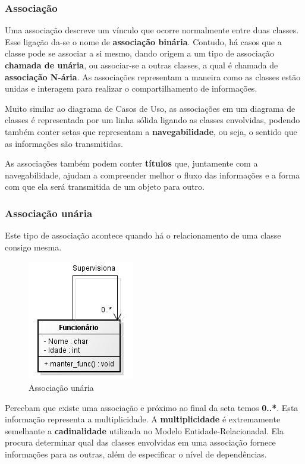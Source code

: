 \subsubsection{Associação}

Uma associação descreve um vínculo que ocorre normalmente entre duas classes. Esse ligação da-se o nome de \textbf{associação binária}. Contudo, há casos que a classe pode se associar a si mesmo, dando origem a um tipo de associação \textbf{chamada de unária}, ou associar-se a outras classes, a qual é chamada de \textbf{associação N-ária}. As associações representam a maneira como as classes estão unidas e interagem para realizar o compartilhamento de informações. 

Muito similar ao diagrama de Casos de Uso, as associações em um diagrama de classes é representada por um linha sólida ligando as classes envolvidas, podendo também conter setas que representam a \textbf{navegabilidade}, ou seja, o sentido que as informações são transmitidas. 

As associações também podem conter \textbf{títulos} que, juntamente com a navegabilidade, ajudam a compreender melhor o fluxo das informações e a forma com que ela será transmitida de um objeto para outro.

\subsubsection{Associação unária}

Este tipo de associação acontece quando há o relacionamento de uma classe consigo mesma. 

\begin{figure}[H]
	\centering
	\includegraphics[scale=0.8]{imagens/associacao-unaria.jpg}
	\caption{Associação unária}
	\label{fig:associacao-unaria}
\end{figure}

Percebam que existe uma associação e próximo ao final da seta temos \textbf{0..*}. Esta informação representa a multiplicidade. A \textbf{multiplicidade} é extremamente semelhante a \textbf{cadinalidade} utilizada no Modelo Entidade-Relacionadal. Ela procura determinar qual das classes envolvidas em uma associação fornece informações para as outras, além de especificar o nível de dependências. 

